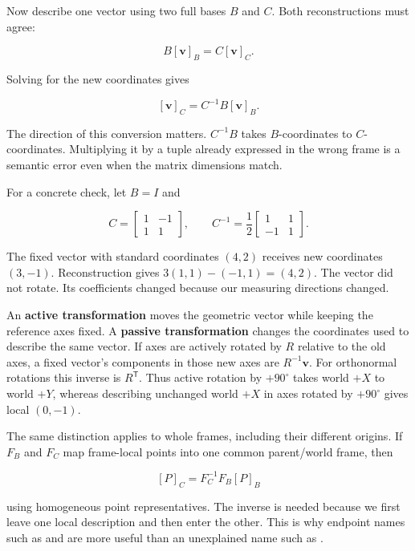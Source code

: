 Now describe one vector using two full bases \(B\) and \(C\). Both reconstructions must agree:

\[
B[\mathbf v]_B=C[\mathbf v]_C.
\]

Solving for the new coordinates gives

\[
[\mathbf v]_C=C^{-1}B[\mathbf v]_B.
\]

The direction of this conversion matters. \(C^{-1}B\) takes \(B\)-coordinates to \(C\)-coordinates. Multiplying it by a tuple already expressed in the wrong frame is a semantic error even when the matrix dimensions match.

For a concrete check, let \(B=I\) and

\[
C=\begin{bmatrix}1&-1\\1&1\end{bmatrix},
\qquad
C^{-1}=\frac12\begin{bmatrix}1&1\\-1&1\end{bmatrix}.
\]

The fixed vector with standard coordinates \((4,2)\) receives new coordinates \((3,-1)\). Reconstruction gives \(3(1,1)-(-1,1)=(4,2)\). The vector did not rotate. Its coefficients changed because our measuring directions changed.

An \textbf{active transformation} moves the geometric vector while keeping the reference axes fixed. A \textbf{passive transformation} changes the coordinates used to describe the same vector. If axes are actively rotated by \(R\) relative to the old axes, a fixed vector's components in those new axes are \(R^{-1}\mathbf v\). For orthonormal rotations this inverse is \(R^{\mathsf T}\). Thus active rotation by \(+90^\circ\) takes world \(+X\) to world \(+Y\), whereas describing unchanged world \(+X\) in axes rotated by \(+90^\circ\) gives local \((0,-1)\).

The same distinction applies to whole frames, including their different origins. If \(F_B\) and \(F_C\) map frame-local points into one common parent/world frame, then

\[
[P]_C=F_C^{-1}F_B[P]_B
\]

using homogeneous point representatives. The inverse is needed because we first leave one local description and then enter the other. This is why endpoint names such as  and  are more useful than an unexplained name such as .

